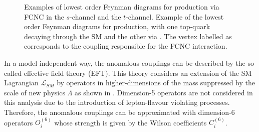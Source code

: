\begin{figure}[htb]
	\centering
	\qquad
	\caption{Examples of lowest order Feynman diagrams for \tZc production via FCNC in  the $s$-channel and  the $t$-channel. Example of the lowest order Feynman diagrams for  \ttbar production, with one top-quark decaying through the SM and the other via \tZc. The vertex labelled as \tZq corresponds to the coupling responsible for the FCNC interaction.}
	\label{fig:signal}
\end{figure} 

\noindent In a model independent way, the anomalous couplings can be described by the so called effective field theory (EFT).
This theory considers an extension of the SM Lagrangian $\mathcal{L}_{SM}$ by operators in higher-dimensions of the mass suppressed by the scale of new physics $\Lambda$ as shown in .
Dimension-5 operators are not considered in this analysis due to the introduction of lepton-flavour violating processes. 
Therefore, the anomalous couplings can be approximated with dimension-6 operators $O_{i}^{(6)}$ whose strength  is given by the Wilson coefficients $C_{i}^{(6)}$.\\

